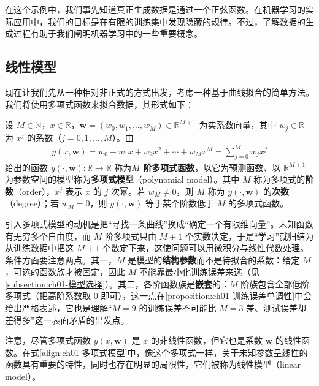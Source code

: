 \documentclass[../../main.tex]{subfiles}
\begin{document}
在这个示例中，我们事先知道真正生成数据是通过一个正弦函数。在机器学习的实际应用中，我们的目标是在有限的训练集中发现隐藏的规律。不过，了解数据的生成过程有助于我们阐明机器学习中的一些重要概念。

\subsection{线性模型}\label{subsection:ch01-线性模型}

现在让我们先从一种相对非正式的方式出发，考虑一种基于曲线拟合的简单方法。我们将使用多项式函数来拟合数据，其形式如下：

\begin{definition}[多项式模型]\label{definition:ch01-多项式模型}
设 $M\in\mathbb{N}$，$x\in\mathbb{R}$，$\mathbf{w}=(w_0,w_1,\dots,w_M)\in\mathbb{R}^{M+1}$ 为实系数向量，其中 $w_j\in\mathbb{R}$ 为 $x^{j}$ 的系数（$j=0,1,\dots,M$）。由
\begin{align}
  y(x,\mathbf{w}) = w_0 + w_1 x + w_2 x^2 + \cdots + w_M x^M = \sum_{j=0}^{M} w_j x^j
  \label{align:ch01-多项式模型}
\end{align}
给出的函数 $y(\cdot,\mathbf{w}):\mathbb{R}\to\mathbb{R}$ 称为\textbf{$M$ 阶多项式函数}，以它为预测函数、以 $\mathbb{R}^{M+1}$ 为参数空间的模型称为\textbf{多项式模型}（polynomial model）。其中 $M$ 称为多项式的\textbf{阶数}（order），$x^{j}$ 表示 $x$ 的 $j$ 次幂。若 $w_M\neq0$，则 $M$ 称为 $y(\cdot,\mathbf{w})$ 的\textbf{次数}（degree）；若 $w_M=0$，则 $y(\cdot,\mathbf{w})$ 等于某个阶数低于 $M$ 的多项式函数。
\end{definition}

\begin{remark}
引入多项式模型的动机是把“寻找一条曲线”换成“确定一个有限维向量”。未知函数有无穷多个自由度，而 $M$ 阶多项式只由 $M+1$ 个实数决定，于是“学习”就归结为从训练数据中把这 $M+1$ 个数定下来，这使问题可以用微积分与线性代数处理。
条件方面要注意两点。其一，$M$ 是模型的\textbf{结构参数}而不是待拟合的系数：给定 $M$，可选的函数族才被固定，因此 $M$ 不能靠最小化训练误差来选（见\cref{subsection:ch01-模型选择}）。其二，各阶函数族是\textbf{嵌套}的：$M$ 阶族包含全部低阶多项式（把高阶系数取 $0$ 即可），这一点在\cref{proposition:ch01-训练误差单调性}中会给出严格表述，它也是理解“$M=9$ 的训练误差不可能比 $M=3$ 差、测试误差却差得多”这一表面矛盾的出发点。
\end{remark}

注意，尽管多项式函数 $y(x,\mathbf{w})$ 是 $x$ 的非线性函数，但它也是系数 $\mathbf{w}$ 的线性函数。在式\eqref{align:ch01-多项式模型}中，像这个多项式一样，关于未知参数呈线性的函数具有重要的特性，同时也存在明显的局限性，它们被称为线性模型（linear model）。
\end{document}
